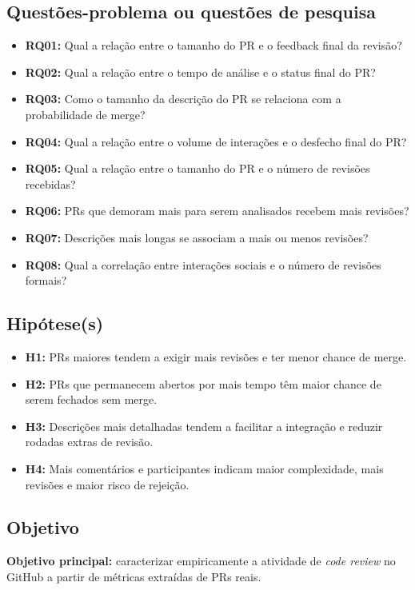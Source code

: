 \documentclass[12pt,a4paper]{article}
\begin{document}
\subsection{Quest\~oes-problema ou quest\~oes de pesquisa}
\begin{itemize}[leftmargin=1.5cm]
\item \textbf{RQ01:} Qual a rela\c{c}\~ao entre o tamanho do PR e o feedback final da revis\~ao?
\item \textbf{RQ02:} Qual a rela\c{c}\~ao entre o tempo de an\'alise e o status final do PR?
\item \textbf{RQ03:} Como o tamanho da descri\c{c}\~ao do PR se relaciona com a probabilidade de merge?
\item \textbf{RQ04:} Qual a rela\c{c}\~ao entre o volume de intera\c{c}\~oes e o desfecho final do PR?
\item \textbf{RQ05:} Qual a rela\c{c}\~ao entre o tamanho do PR e o n\'umero de revis\~oes recebidas?
\item \textbf{RQ06:} PRs que demoram mais para serem analisados recebem mais revis\~oes?
\item \textbf{RQ07:} Descri\c{c}\~oes mais longas se associam a mais ou menos revis\~oes?
\item \textbf{RQ08:} Qual a correla\c{c}\~ao entre intera\c{c}\~oes sociais e o n\'umero de revis\~oes formais?
\end{itemize}

\subsection{Hip\'otese(s)}
\begin{itemize}[leftmargin=1.5cm]
\item \textbf{H1:} PRs maiores tendem a exigir mais revis\~oes e ter menor chance de merge.
\item \textbf{H2:} PRs que permanecem abertos por mais tempo t\^em maior chance de serem fechados sem merge.
\item \textbf{H3:} Descri\c{c}\~oes mais detalhadas tendem a facilitar a integra\c{c}\~ao e reduzir rodadas extras de revis\~ao.
\item \textbf{H4:} Mais coment\'arios e participantes indicam maior complexidade, mais revis\~oes e maior risco de rejei\c{c}\~ao.
\end{itemize}

\subsection{Objetivo}
\textbf{Objetivo principal:} caracterizar empiricamente a atividade de \textit{code review} no GitHub a partir de m\'etricas extra\'idas de PRs reais.
\end{document}
